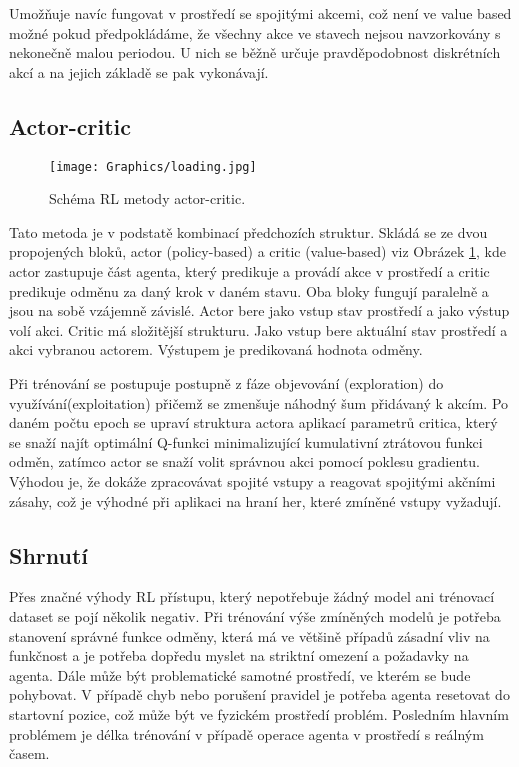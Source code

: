 \documentclass[czech, bc, kky, he, iso690alph]{fasthesis}
\begin{document}
	            Umožňuje navíc fungovat v prostředí se spojitými akcemi, což není ve value based možné pokud předpokládáme, že všechny akce ve stavech nejsou navzorkovány s nekonečně malou periodou. U nich se běžně určuje pravděpodobnost diskrétních akcí a na jejich základě se pak vykonávají.
            
            \subsection{Actor-critic}
            		
            		\begin{figure}[h]
            			\centering
            			\texttt{[image: Graphics/loading.jpg]}
            			\caption{Schéma RL metody actor-critic.}
            			\label{pic:actor_critic}
            		\end{figure}
            		
	            Tato metoda je v podstatě kombinací předchozích struktur. Skládá se ze dvou propojených bloků, actor (policy-based) a critic (value-based) viz Obrázek \ref{pic:actor_critic}, kde actor zastupuje část agenta, který predikuje a provádí akce v prostředí a critic predikuje odměnu za daný krok v daném stavu. Oba bloky fungují paralelně a jsou na sobě vzájemně závislé. Actor bere jako vstup stav prostředí a jako výstup volí akci. Critic má složitější strukturu. Jako vstup bere aktuální stav prostředí a akci vybranou actorem. Výstupem je predikovaná hodnota odměny.
	            
	            Při trénování se postupuje postupně z fáze objevování (exploration) do využívání(exploitation) přičemž se zmenšuje náhodný šum přidávaný k akcím. Po daném počtu epoch se upraví struktura actora aplikací parametrů critica, který se snaží najít optimální Q-funkci minimalizující kumulativní ztrátovou funkci odměn, zatímco actor se snaží volit správnou akci pomocí poklesu gradientu. Výhodou je, že dokáže zpracovávat spojité vstupy a reagovat spojitými akčními zásahy, což je výhodné při aplikaci na hraní her, které zmíněné vstupy vyžadují.
	            
        	\subsection{Shrnutí}
        		Přes značné výhody RL přístupu, který nepotřebuje žádný model ani trénovací dataset se pojí několik negativ. Při trénování výše zmíněných modelů je potřeba stanovení správné funkce odměny, která má ve většině případů zásadní vliv na funkčnost a je potřeba dopředu myslet na striktní omezení a požadavky na agenta. Dále může být problematické samotné prostředí, ve kterém se bude pohybovat. V případě chyb nebo porušení pravidel je potřeba agenta resetovat do startovní pozice, což může být ve fyzickém prostředí problém. Posledním hlavním problémem je délka trénování v případě operace agenta v prostředí s reálným časem.
            
\end{document}
